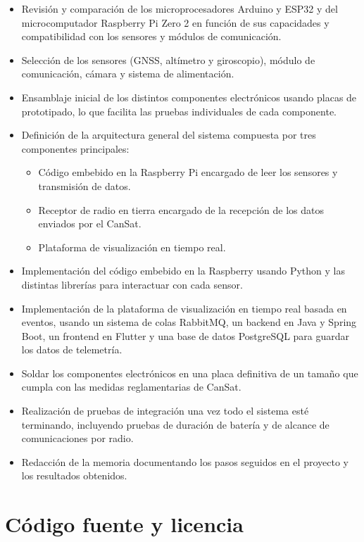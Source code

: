\begin{itemize}
    \item Revisión y comparación de los microprocesadores Arduino y ESP32 y del microcomputador Raspberry Pi Zero 2 en función de sus capacidades y compatibilidad con los sensores y módulos de comunicación.
    \item Selección de los sensores (GNSS, altímetro y giroscopio), módulo de comunicación, cámara y sistema de alimentación.
    \item Ensamblaje inicial de los distintos componentes electrónicos usando placas de prototipado, lo que facilita las pruebas individuales de cada componente.
    \item Definición de la arquitectura general del sistema compuesta por tres componentes principales:
    \begin{itemize}
        \item Código embebido en la Raspberry Pi encargado de leer los sensores y transmisión de datos.
        \item Receptor de radio en tierra encargado de la recepción de los datos enviados por el CanSat.
        \item Plataforma de visualización en tiempo real.
    \end{itemize}
    \item Implementación del código embebido en la Raspberry usando Python y las distintas librerías para interactuar con cada sensor.
    \item Implementación de la plataforma de visualización en tiempo real basada en eventos, usando un sistema de colas RabbitMQ, un backend en Java y Spring Boot, un frontend en Flutter y una base de datos PostgreSQL para guardar los datos de telemetría.
    \item Soldar los componentes electrónicos en una placa definitiva de un tamaño que cumpla con las medidas reglamentarias de CanSat.
    \item Realización de pruebas de integración una vez todo el sistema esté terminando, incluyendo pruebas de duración de batería y de alcance de comunicaciones por radio.
    \item Redacción de la memoria documentando los pasos seguidos en el proyecto y los resultados obtenidos.
\end{itemize}


\section{Código fuente y licencia}

